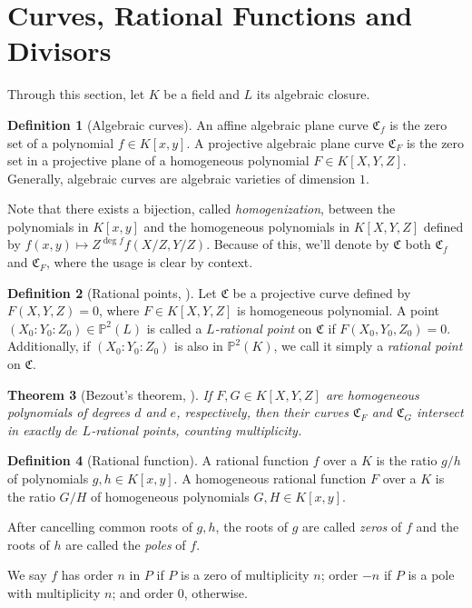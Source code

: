 \documentclass[11pt, oneside]{amsart}
\newtheorem{thm}{Theorem}[section]
\theoremstyle{definition}
\newtheorem{defn}[thm]{Definition}
\theoremstyle{remark}
\numberwithin{equation}{section}
\begin{document}
\section{Curves, Rational Functions and Divisors}

Through this section, let $K$ be a field and $L$ its algebraic closure.

\begin{defn}[Algebraic curves]
	An affine algebraic plane curve $\mathfrak C_f$ is the zero set of a polynomial $f \in K[x, y]$.
	A projective algebraic plane curve $\mathfrak C_F$ is the zero set in a projective plane of a homogeneous polynomial $F \in K[X, Y, Z]$.
	Generally, algebraic curves are algebraic varieties of dimension $1$.
\end{defn}

Note that there exists a bijection, called \emph{homogenization}, between the polynomials in $K[x, y]$ and the homogeneous polynomials in $K[X, Y, Z]$ defined by $f(x, y) \mapsto Z^{\deg f}f(X/Z, Y/Z)$.
Because of this, we'll denote by $\mathfrak C$ both $\mathfrak C_f$ and $\mathfrak C_F$, where the usage is clear by context.

\begin{defn}[Rational points, \cite{Wal00}] %
	Let $\mathfrak C$ be a projective curve defined by $F(X, Y, Z) = 0$, where $F \in K[X, Y, Z]$ is homogeneous polynomial.
	A point $(X_0 : Y_0 : Z_0) \in \mathbb{P}^2(L)$ is called a \emph{$L$-rational point} on $\mathfrak C$ if $F(X_0, Y_0, Z_0) = 0$.
	Additionally, if $(X_0 : Y_0 : Z_0)$ is also in $\mathbb{P}^2(K)$, we call it simply a \emph{rational point} on $\mathfrak C$.
\end{defn}


\begin{thm}[Bezout's theorem, \cite{Wal00}] %
	If $F, G \in K[X, Y, Z]$ are homogeneous polynomials of degrees $d$ and $e$, respectively, then their curves $\mathfrak C_F$ and $\mathfrak C_G$ intersect in exactly $de$ $L$-rational points, counting multiplicity.
\end{thm}

\begin{defn}[Rational function]
	A rational function $f$ over a $K$ is the ratio $g/h$ of polynomials $g, h \in K[x, y]$.
	A homogeneous rational function $F$ over a $K$ is the ratio $G/H$ of homogeneous polynomials $G, H \in K[x, y]$.

	After cancelling common roots of $g, h$, the roots of $g$ are called \emph{zeros} of $f$ and the roots of $h$ are called the \emph{poles} of $f$.
	
	We say $f$ has order $n$ in $P$ if $P$ is a zero of multiplicity $n$; order $-n$ if $P$ is a pole with multiplicity $n$; and order $0$, otherwise.
\end{defn}
\end{document}
